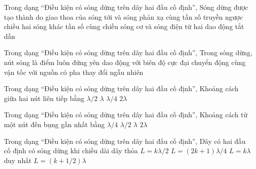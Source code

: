 \begin{ex}
Trong dạng “Điều kiện có sóng dừng trên dây hai đầu cố định”, Sóng dừng được tạo thành do giao thoa của
\choice
{\True sóng tới và sóng phản xạ cùng tần số truyền ngược chiều}
{hai sóng khác tần số cùng chiều}
{sóng cơ và sóng điện từ}
{hai dao động tắt dần}
\end{ex}

\begin{ex}
Trong dạng “Điều kiện có sóng dừng trên dây hai đầu cố định”, Trong sóng dừng, nút sóng là điểm
\choice
{\True luôn đứng yên}
{dao động với biên độ cực đại}
{chuyển động cùng vận tốc với nguồn}
{có pha thay đổi ngẫu nhiên}
\end{ex}

\begin{ex}
Trong dạng “Điều kiện có sóng dừng trên dây hai đầu cố định”, Khoảng cách giữa hai nút liên tiếp bằng
\choice
{\True $\lambda/2$}
{$\lambda$}
{$\lambda/4$}
{$2\lambda$}
\end{ex}

\begin{ex}
Trong dạng “Điều kiện có sóng dừng trên dây hai đầu cố định”, Khoảng cách từ một nút đến bụng gần nhất bằng
\choice
{\True $\lambda/4$}
{$\lambda/2$}
{$\lambda$}
{$2\lambda$}
\end{ex}

\begin{ex}
Trong dạng “Điều kiện có sóng dừng trên dây hai đầu cố định”, Dây có hai đầu cố định có sóng dừng khi chiều dài dây thỏa
\choice
{\True $L=k\lambda/2$}
{$L=(2k+1)\lambda/4$}
{$L=k\lambda$ duy nhất}
{$L=(k+1/2)\lambda$}
\end{ex}

